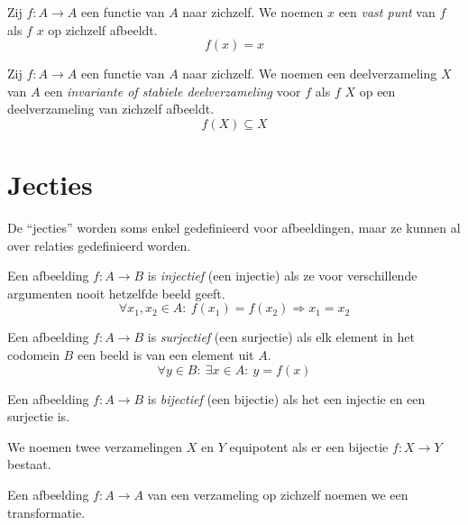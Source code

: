 \documentclass[main.tex]{subfiles}
\begin{document}
\begin{de}
  Zij $f: A \rightarrow A$ een functie van $A$ naar zichzelf.
  We noemen $x$ een \emph{vast punt} van $f$ als $f$ $x$ op zichzelf afbeeldt.
  \[ f(x) = x \]
\end{de}

\begin{de}
  Zij $f: A \rightarrow A$ een functie van $A$ naar zichzelf.
  We noemen een deelverzameling $X$ van $A$ een \emph{invariante of stabiele deelverzameling} voor $f$ als $f$ $X$ op een deelverzameling van zichzelf afbeeldt.
  \[ f(X) \subseteq X \]
\end{de}

\section{Jecties}
\label{sec:jecties}

\begin{opm}
  De ``jecties'' worden soms enkel gedefinieerd voor afbeeldingen, maar ze kunnen al over relaties gedefinieerd worden.
\end{opm}

\begin{de}
  \label{de:afbeelding-injectief}
  Een afbeelding $f: A \rightarrow B$ is \emph{injectief} (een injectie) als ze voor verschillende argumenten nooit hetzelfde beeld geeft.
  \[ \forall x_{1},x_{2} \in A:\ f(x_{1}) = f(x_{2}) \Rightarrow x_{1}= x_{2} \]
\end{de}

\begin{de}
  \label{de:afbeelding-surjectief}
  Een afbeelding $f: A \rightarrow B$ is \emph{surjectief} (een surjectie) als elk element in het codomein $B$ een beeld is van een element uit $A$.
  \[ \forall y \in B:\ \exists x \in A:\ y = f(x) \]
\end{de}

\begin{de}
  \label{de:afbeelding-bijectief}
  Een afbeelding $f: A \rightarrow B$ is \emph{bijectief} (een bijectie) als het een injectie en een surjectie is.
\end{de}

\begin{de}
  We noemen twee verzamelingen $X$ en $Y$ equipotent als er een bijectie $f: X \rightarrow Y$ bestaat.
\end{de}

\begin{de}
  Een afbeelding $f: A \rightarrow A$ van een verzameling op zichzelf noemen we een transformatie.
\end{de}
\end{document}
